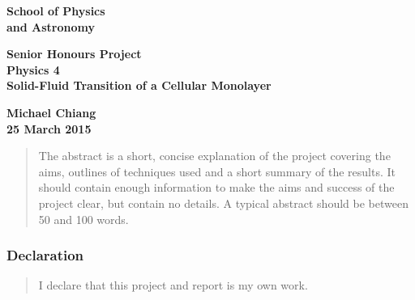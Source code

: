 \documentclass[a4paper,12pt]{article}
\begin{document}
\pagestyle{empty}                       %
\epsfxsize=40mm                         %
\begin{minipage}[b]{110mm}
        {\Huge\bf School of Physics\\ and Astronomy
        \vspace*{17mm}}
\end{minipage}
\hfill
\begin{minipage}[t]{40mm}               
\end{minipage}
\par\noindent                                           %
\vspace*{2cm}
\begin{center}
        \Large\bf \Large\bf Senior Honours Project\\
        \Large\bf Physics 4\\[10pt]                     %
        \LARGE\bf Solid-Fluid Transition of a Cellular Monolayer         %
\end{center}
\vspace*{0.5cm}
\begin{center}
        \bf Michael Chiang\\                           %
        25 March 2015                                    %
\end{center}
\vspace*{5mm}
%
%                       
\begin{abstract}
        The abstract is a short, concise explanation of the project
        covering the aims, outlines of techniques used and a short
        summary of the results. It should contain enough information to
        make the aims and success of the project clear, but contain no details.
        A typical abstract should be between 50 and 100 words.
\end{abstract}

\vspace*{1cm}

\subsubsection*{Declaration}

\begin{quotation}
        I declare that this project and report is my own work.
\end{quotation}
\end{document}
